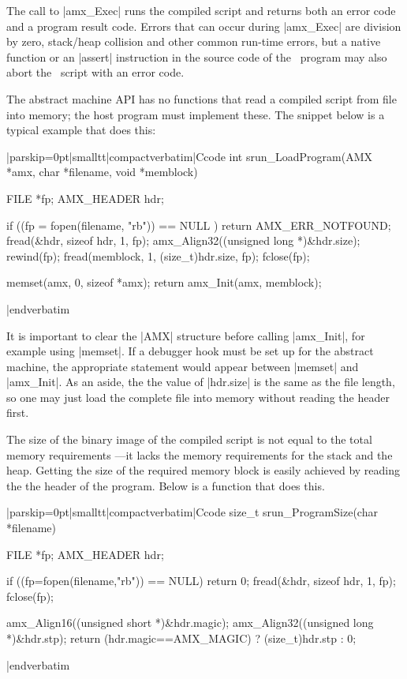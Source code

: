 The call to |amx_Exec| runs the compiled script and returns both an error code
and a program result code. Errors that can occur during |amx_Exec| are
division by zero, stack\slash heap collision and other common run-time errors,
but a native function or an |assert| instruction in the source code of the
\Small\ program may also abort the \Small\ script with an error code.

The abstract machine API has no functions that read a compiled script from
file into memory; the host program must implement these. The snippet below is
a typical example that does this:

\listingx\verbatim|parskip=0pt|smalltt|compactverbatim|Ccode
int srun_LoadProgram(AMX *amx, char *filename, void *memblock)
{
  FILE *fp;
  AMX_HEADER hdr;

  if ((fp = fopen(filename, "rb")) == NULL )
    return AMX_ERR_NOTFOUND;
  fread(&hdr, sizeof hdr, 1, fp);
  amx_Align32((unsigned long *)&hdr.size);
  rewind(fp);
  fread(memblock, 1, (size_t)hdr.size, fp);
  fclose(fp);

  memset(amx, 0, sizeof *amx);
  return amx_Init(amx, memblock);
}
|endverbatim\endlistingx

It is important to clear the |AMX| structure before calling |amx_Init|, for
example using |memset|. If a debugger hook must be set up for the abstract
machine, the appropriate statement would appear between |memset| and |amx_Init|.
As an aside, the the value of |hdr.size| is the same as the file length, so one
may just load the complete file into memory without reading the header first.

The size of the binary image of the compiled script is not equal to the total
memory requirements ---it lacks the memory requirements for the stack and the
heap. Getting the size of the required memory block is easily achieved by
reading the the header of the program. Below is a function that does this.

\listingx\verbatim|parskip=0pt|smalltt|compactverbatim|Ccode
size_t srun_ProgramSize(char *filename)
{
  FILE *fp;
  AMX_HEADER hdr;

  if ((fp=fopen(filename,"rb")) == NULL)
    return 0;
  fread(&hdr, sizeof hdr, 1, fp);
  fclose(fp);

  amx_Align16((unsigned short *)&hdr.magic);
  amx_Align32((unsigned long *)&hdr.stp);
  return (hdr.magic==AMX_MAGIC) ? (size_t)hdr.stp : 0;
}
|endverbatim\endlistingx

